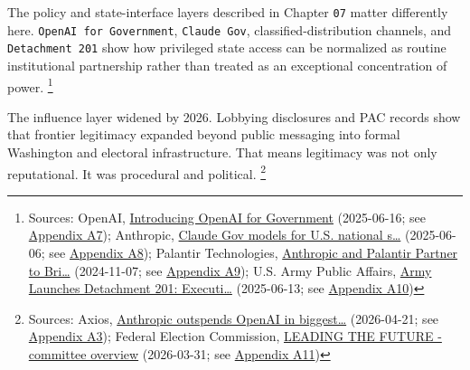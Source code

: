 \documentclass[
  american,
  11pt,
  letterpaper,
]{article}
\begin{document}
The policy and state-interface layers described in Chapter \texttt{07}
matter differently here. \texttt{OpenAI\ for\ Government},
\texttt{Claude\ Gov}, classified-distribution channels, and
\texttt{Detachment\ 201} show how privileged state access can be
normalized as routine institutional partnership rather than treated as
an exceptional concentration of power. \footnote{Sources: OpenAI,
  \href{https://openai.com/global-affairs/introducing-openai-for-government/}{Introducing
  OpenAI for Government} (2025-06-16; see
  \hyperref[ch-08-appendix-a7-introducing-openai-for-government]{Appendix
  A7}); Anthropic,
  \href{https://www.anthropic.com/news/claude-gov-models-for-u-s-national-security-customers}{Claude
  Gov models for U.S. national s\ldots{}} (2025-06-06; see
  \hyperref[ch-08-appendix-a8-claude-gov-models-for-u-s-national-security-customers]{Appendix
  A8}); Palantir Technologies,
  \href{https://investors.palantir.com/news-details/2024/Anthropic-and-Palantir-Partner-to-Bring-Claude-AI-Models-to-AWS-for-U.S.-Government-Intelligence-and-Defense-Operations/}{Anthropic
  and Palantir Partner to Bri\ldots{}} (2024-11-07; see
  \hyperref[ch-08-appendix-a9-anthropic-and-palantir-partner-to-bring-claude-ai-models-to-aws-for-u-s-government-intelligence-and-defense-operations]{Appendix
  A9}); U.S. Army Public Affairs,
  \href{https://www.army.mil/article/286317/army_launches_detachment_201_executive_innovation_corps_to_drive_tech_transformation}{Army
  Launches Detachment 201: Executi\ldots{}} (2025-06-13; see
  \hyperref[ch-08-appendix-a10-army-launches-detachment-201-executive-innovation-corps-to-drive-tech-transformation]{Appendix
  A10})}

The influence layer widened by 2026. Lobbying disclosures and PAC
records show that frontier legitimacy expanded beyond public messaging
into formal Washington and electoral infrastructure. That means
legitimacy was not only reputational. It was procedural and political.
\footnote{Sources: Axios,
  \href{https://www.axios.com/2026/04/21/anthropic-outspends-openai-biggest-lobbying-quarter}{Anthropic
  outspends OpenAI in biggest\ldots{}} (2026-04-21; see
  \hyperref[ch-08-appendix-a3-anthropic-outspends-openai-in-biggest-ever-lobbying-quarter]{Appendix
  A3}); Federal Election Commission,
  \href{https://www.fec.gov/data/committee/C00916114/}{LEADING THE
  FUTURE - committee overview} (2026-03-31; see
  \hyperref[ch-08-appendix-a11-leading-the-future-committee-overview]{Appendix
  A11})}
\end{document}
